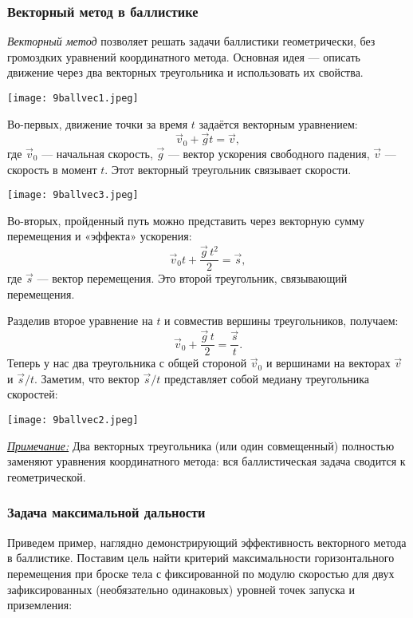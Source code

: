 \documentclass[12pt, a4paper]{article}%
\begin{document}
\subsubsection*{Векторный метод в баллистике}
\textit{Векторный метод} позволяет решать задачи баллистики геометрически, без громоздких уравнений
координатного метода. Основная идея — описать движение через два векторных треугольника и 
использовать их свойства.



\begin{center}
\texttt{[image: 9ballvec1.jpeg]}
\label{fig:mpr}
\end{center}

Во-первых, движение точки за время $t$ задаётся векторным уравнением:
\[
\vec v_0 + \vec gt = \vec v,
\]
где $\vec v_0$ — начальная скорость, $\vec g$ — вектор ускорения свободного падения, $\vec v$ — скорость в момент $t$. Этот векторный треугольник связывает скорости.


\begin{center}
\texttt{[image: 9ballvec3.jpeg]}
\label{fig:mpr}
\end{center}


Во-вторых, пройденный путь можно представить через векторную сумму перемещения и «эффекта» ускорения:
\[
\vec v_0t + \frac{\vec g\,t^2}{2} = \vec s,
\]
где $\vec s$ — вектор перемещения. Это второй треугольник, связывающий перемещения.

Разделив второе уравнение на $t$ и совместив вершины треугольников, получаем:
\[
\vec v_0 + \frac{\vec g\,t}{2} = \frac{\vec s}{t}.
\]
Теперь у нас два треугольника с общей стороной $\vec v_0$ и вершинами на векторах $\vec v$
и $\vec s/t$. Заметим, что вектор $\vec s/t$ представляет собой медиану треугольника скоростей:

\begin{center}
\texttt{[image: 9ballvec2.jpeg]}
\label{fig:mpr}
\end{center}

\textit{\underline{Примечание:}} Два векторных треугольника (или один совмещенный) полностью заменяют уравнения
координатного метода: вся баллистическая задача сводится к геометрической.


\subsubsection*{Задача максимальной дальности}

Приведем пример, наглядно демонстрирующий эффективность векторного метода в баллистике. 
Поставим цель найти критерий максимальности горизонтального перемещения при броске тела с фиксированной по модулю скоростью
для двух зафиксированных (необязательно одинаковых) уровней точек запуска и приземления:
\end{document}
